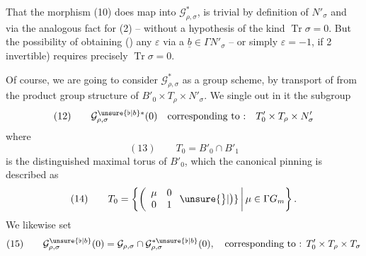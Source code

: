 
That the morphism (10) does map into $\mathcal G_{\rho,\sigma}^{*}$,
is trivial by definition of $N'_\sigma$ and via the analogous fact for (2)
-- without a hypothesis of the kind $\operatorname{Tr}\sigma=0$.
But the possibility of obtaining ()
any $\varepsilon$ via a $\underline b\in\Gamma N'_\sigma$
-- or simply $\varepsilon=-1$, if 2 invertible) requires precisely
$\operatorname{Tr}\sigma=0$.

Of course, we are going to consider $\mathcal G_{\rho,\sigma}^{*}$ as a group scheme,
by transport of  from the product group structure of
$B'_0\times T_\rho\times N'_\sigma$.
We single out in it the subgroup
\[
(12)\qquad \mathcal G_{\rho,\sigma}^{\unsure{\flat|b}*}(0)
\quad\text{corresponding to :}\quad T'_0\times T_\rho\times N'_\sigma
\]
where
\[
(13)\qquad T_0=B'_0\cap B'_1
\]
is the distinguished maximal torus of $B'_0$, which
 the canonical pinning is described as
\[
(14)\qquad T_0=\left\{\left(\begin{array}{cc}\mu&0\\0&1\end{array}\right.\unsure{\big\}|\big)}
\,\middle|\,\mu\in\Gamma\mathbb \mathbb G_m\right\}.
\]
We likewise set
\[
(15)\qquad \mathcal G_{\rho,\sigma}^{\unsure{\flat|b}}(0)
=\mathcal G_{\rho,\sigma}\cap\mathcal G_{\rho,\sigma}^{*\unsure{\flat|b}}(0),
\quad\text{corresponding to : }T'_0\times T_\rho\times T_\sigma
\]



